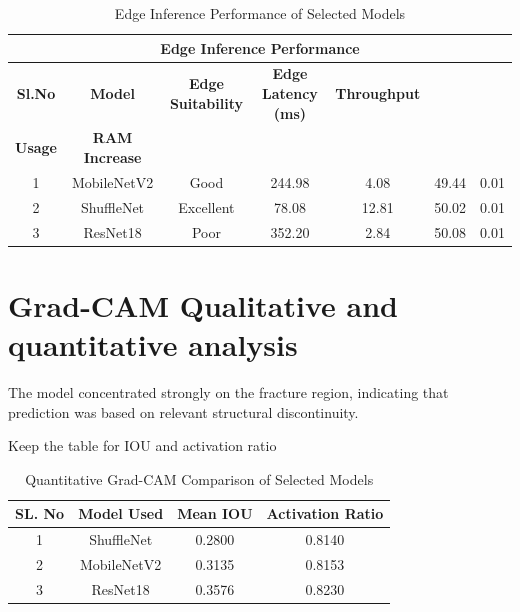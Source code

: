 \begin{table}[htbp]
\centering

\scriptsize
\renewcommand{\arraystretch}{1.3}
\setlength{\tabcolsep}{5pt}

\begin{tabular}{|c|c|c|c|c|c|c|}
\hline
\multicolumn{7}{|c|}{\textbf{Edge Inference Performance}} \\
\hline

\rowcolor{yellow}
\textbf{Sl.No} &
\textbf{Model} &
\textbf{Edge Suitability} &
\textbf{Edge Latency (ms)} &
\textbf{Throughput} &
\makecell{\textbf{Average CPU} \\ \textbf{Usage}} &
\textbf{RAM Increase} \\
\hline

1 & MobileNetV2 & Good      & 244.98 & 4.08  & 49.44 & 0.01 \\
\hline
2 & ShuffleNet  & Excellent & 78.08  & 12.81 & 50.02 & 0.01 \\
\hline
3 & ResNet18    & Poor      & 352.20 & 2.84  & 50.08 & 0.01 \\
\hline

\end{tabular}
\caption{Edge Inference Performance of Selected Models}
\label{tab:edge_inference_performance}
\end{table}

\section{Grad-CAM Qualitative and quantitative analysis}
The model concentrated strongly on the fracture region, indicating that prediction was based on relevant structural discontinuity.

Keep the table for IOU and activation ratio


\begin{table}[htbp]
\centering

\renewcommand{\arraystretch}{1.3}

\begin{tabular}{|c|c|c|c|}
\hline
\rowcolor{yellow}
\textbf{SL. No} & \textbf{Model Used} & \textbf{Mean IOU} & \textbf{Activation Ratio} \\

\hline
1 & ShuffleNet   & 0.2800 & 0.8140 \\
\hline
2 & MobileNetV2  & 0.3135 & 0.8153 \\
\hline
3 & ResNet18     & 0.3576 & 0.8230 \\
\hline

\end{tabular}
\caption{Quantitative Grad-CAM Comparison of Selected Models}
\label{tab:gradcam_comparison}
\end{table}

